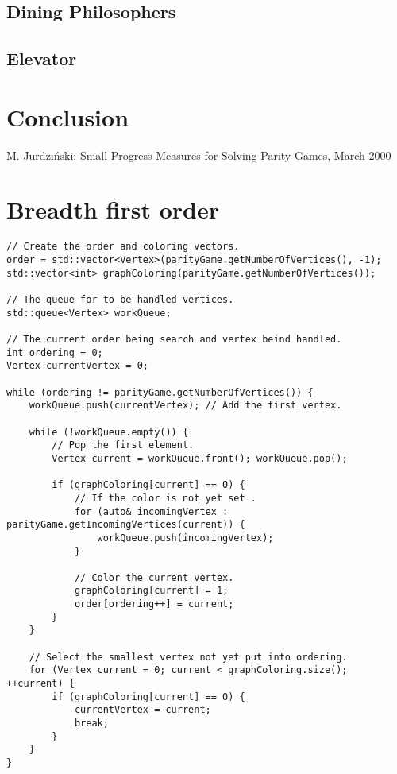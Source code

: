 \documentclass[10pt,a4paper]{article}
\begin{document}
\subsection{Dining Philosophers}

\subsection{Elevator}


\section{Conclusion}\label{conc}


\begin{thebibliography}{9}
 M. Jurdzi\'{n}ski: Small Progress Measures for Solving Parity Games, March 2000
\end{thebibliography}


\newpage
\appendix

\section{Breadth first order}\label{appendix:bfs}

\begin{verbatim}
// Create the order and coloring vectors.
order = std::vector<Vertex>(parityGame.getNumberOfVertices(), -1);
std::vector<int> graphColoring(parityGame.getNumberOfVertices());

// The queue for to be handled vertices.
std::queue<Vertex> workQueue;

// The current order being search and vertex beind handled.
int ordering = 0;
Vertex currentVertex = 0;

while (ordering != parityGame.getNumberOfVertices()) {
	workQueue.push(currentVertex); // Add the first vertex.

    while (!workQueue.empty()) {
    	// Pop the first element.
        Vertex current = workQueue.front(); workQueue.pop();

        if (graphColoring[current] == 0) {
        	// If the color is not yet set .
            for (auto& incomingVertex : parityGame.getIncomingVertices(current)) {
            	workQueue.push(incomingVertex);
            }

            // Color the current vertex.
            graphColoring[current] = 1;
            order[ordering++] = current;
        }
    }

    // Select the smallest vertex not yet put into ordering.
    for (Vertex current = 0; current < graphColoring.size(); ++current) {
    	if (graphColoring[current] == 0) {
        	currentVertex = current;
            break;
        }
    }
}
\end{verbatim}
\end{document}

